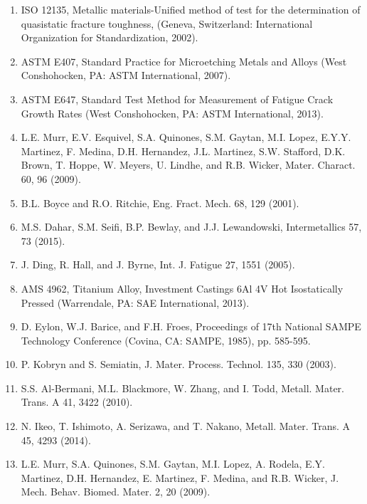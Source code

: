 \documentclass[10pt]{article}
\begin{document}
\begin{enumerate}
  \item ISO 12135, Metallic materials-Unified method of test for the determination of quasistatic fracture toughness, (Geneva, Switzerland: International Organization for Standardization, 2002).

  \item ASTM E407, Standard Practice for Microetching Metals and Alloys (West Conshohocken, PA: ASTM International, 2007).

  \item ASTM E647, Standard Test Method for Measurement of Fatigue Crack Growth Rates (West Conshohocken, PA: ASTM International, 2013).

  \item L.E. Murr, E.V. Esquivel, S.A. Quinones, S.M. Gaytan, M.I. Lopez, E.Y.Y. Martinez, F. Medina, D.H. Hernandez, J.L. Martinez, S.W. Stafford, D.K. Brown, T. Hoppe, W. Meyers, U. Lindhe, and R.B. Wicker, Mater. Charact. 60, 96 (2009).

  \item B.L. Boyce and R.O. Ritchie, Eng. Fract. Mech. 68, 129 (2001).

  \item M.S. Dahar, S.M. Seifi, B.P. Bewlay, and J.J. Lewandowski, Intermetallics 57, 73 (2015).

  \item J. Ding, R. Hall, and J. Byrne, Int. J. Fatigue 27, 1551 (2005).

  \item AMS 4962, Titanium Alloy, Investment Castings 6Al 4V Hot Isostatically Pressed (Warrendale, PA: SAE International, 2013).

  \item D. Eylon, W.J. Barice, and F.H. Froes, Proceedings of 17th National SAMPE Technology Conference (Covina, CA: SAMPE, 1985), pp. 585-595.

  \item P. Kobryn and S. Semiatin, J. Mater. Process. Technol. 135, 330 (2003).

  \item S.S. Al-Bermani, M.L. Blackmore, W. Zhang, and I. Todd, Metall. Mater. Trans. A 41, 3422 (2010).

  \item N. Ikeo, T. Ishimoto, A. Serizawa, and T. Nakano, Metall. Mater. Trans. A 45, 4293 (2014).

  \item L.E. Murr, S.A. Quinones, S.M. Gaytan, M.I. Lopez, A. Rodela, E.Y. Martinez, D.H. Hernandez, E. Martinez, F. Medina, and R.B. Wicker, J. Mech. Behav. Biomed. Mater. 2, 20 (2009).


\end{enumerate}
\end{document}
